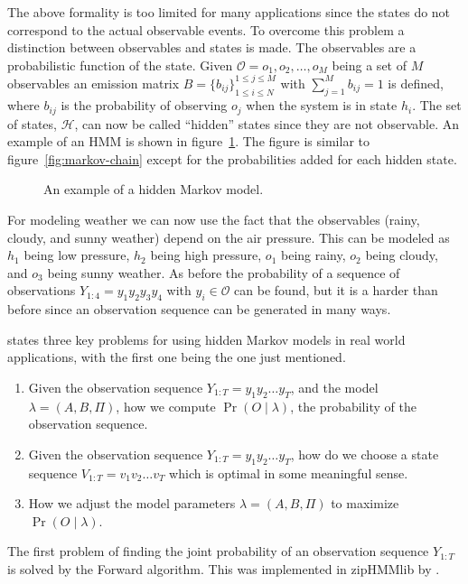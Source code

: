 The above formality is too limited for many applications since the states do
not correspond to the actual observable events. To overcome this problem a
distinction between observables and states is made. The observables are a
probabilistic function of the state. Given
$\mathcal{O} = {o_1, o_2, \dots, o_M}$ being a set of $M$ observables an
emission matrix $B = {\{b_{ij}\}}_{1 \le i \le N}^{1 \le j \le M}$ with
$\sum_{j=1}^M b_{ij} = 1$ is defined, where $b_{ij}$ is the probability of
observing $o_j$ when the system is in state $h_i$. The set of states,
$\mathcal{H}$, can now be called ``hidden'' states since they are not
observable. An example of an HMM is shown in
figure~\ref{fig:hidden-markov-model}. The figure is similar to
figure~\ref{fig:markov-chain} except for the probabilities added for each
hidden state.

\begin{figure}
  \centering
  
  \caption{An example of a hidden Markov model.}
  \label{fig:hidden-markov-model}
\end{figure}

For modeling weather we can now use the fact that the observables (rainy,
cloudy, and sunny weather) depend on the air pressure. This can be modeled as
$h_1$ being low pressure, $h_2$ being high pressure, $o_1$ being rainy, $o_2$
being cloudy, and $o_3$ being sunny weather. As before the probability of a
sequence of observations $Y_{1:4} = y_1y_2y_3y_4$ with $y_i \in \mathcal{O}$
can be found, but it is a harder than before since an observation sequence can be
generated in many ways.

\citet{rabiner1989tutorial} states three key problems for using hidden Markov
models in real world applications, with the first one being the one just
mentioned.
\begin{enumerate}
\item Given the observation sequence $Y_{1:T} = y_1y_2\dots{}y_T$, and the
  model $\lambda = (A, B, \Pi)$, how we compute $\Pr(O \mid \lambda)$, the
  probability of the observation sequence.
\item Given the observation sequence $Y_{1:T} = y_1y_2\dots{}y_T$, how do we
  choose a state sequence $V_{1:T} = v_1v_2\dots{}v_T$ which is optimal in some
  meaningful sense.
\item How we adjust the model parameters $\lambda = (A, B, \Pi)$ to maximize
  $\Pr(O \mid \lambda)$.
\end{enumerate}

The first problem of finding the joint probability of an observation sequence
$Y_{1:T}$ is solved by the Forward algorithm. This was implemented in zipHMMlib
by \citet{sand2013ziphmmlib}.

